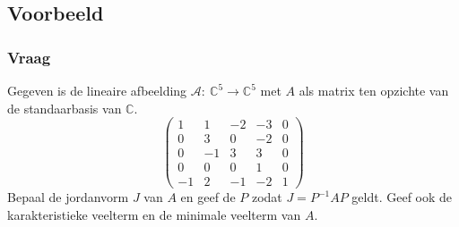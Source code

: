 \documentclass[main.tex]{subfiles}
\begin{document}
\subsection*{Voorbeeld}

\subsubsection*{Vraag}
Gegeven is de lineaire afbeelding $\mathcal{A}:\ \mathbb{C}^{5} \rightarrow \mathbb{C}^{5}$ met $A$ als matrix ten opzichte van de standaarbasis van $\mathbb{C}$.
\[
\begin{pmatrix}
  1 & 1 & -2 & -3 & 0\\
  0 & 3 & 0 & -2 & 0\\
  0 & -1 & 3 & 3 & 0\\
  0 & 0 & 0 & 1 & 0\\
  -1 & 2 & -1 & -2 & 1
\end{pmatrix}
\]
Bepaal de jordanvorm $J$ van $A$ en geef de $P$ zodat $J=P^{-1}AP$ geldt.
Geef ook de karakteristieke veelterm en de minimale veelterm van $A$.
\end{document}
